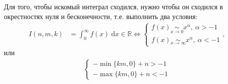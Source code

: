 Для того, чтобы искомый интеграл сходился, нужно чтобы он сходился в окрестностях нуля и бесконечности, т.е. выполнить два условия:
\begin{align*}
  I(n,m,k) &= \int_{0}^{\infty} f(x)\; \mathrm{d} x \in \mathbb{R} \iff
  \begin{cases}
    f(x) \underset{x \rightarrow 0}{\sim} x^\alpha,\ \alpha > -1\\
    f(x) \underset{x \rightarrow \infty}{\sim} x^\alpha,\ \alpha < -1
  \end{cases},
\end{align*}
или
\begin{align*}
  \boxed{
  \begin{cases}
    -\min\{km, 0\} + n > -1\\
    -\max\{km, 0\} + n < -1
  \end{cases}
  }
\end{align*}